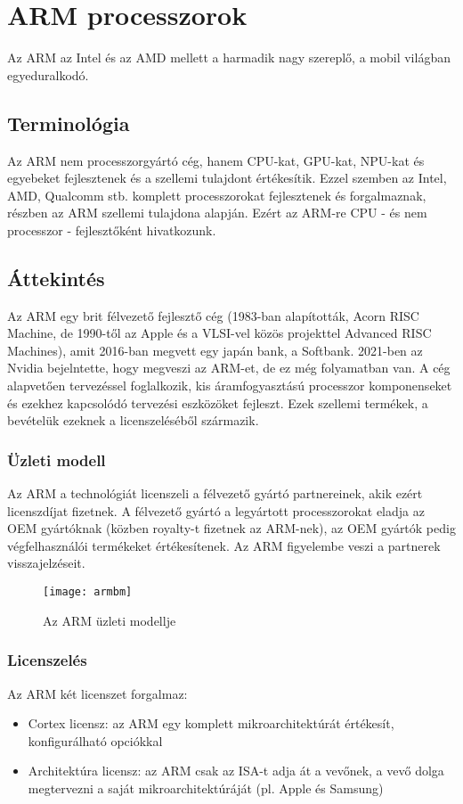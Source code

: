 
\chapter{ARM processzorok}

Az ARM az Intel és az AMD mellett a harmadik nagy szereplő, a mobil világban egyeduralkodó.

\section{Terminológia}
Az ARM nem processzorgyártó cég, hanem CPU-kat, GPU-kat, NPU-kat és egyebeket fejlesztenek és a szellemi tulajdont értékesítik.
Ezzel szemben az Intel, AMD, Qualcomm stb. komplett processzorokat fejlesztenek és forgalmaznak, részben az ARM szellemi tulajdona alapján.
Ezért az ARM-re CPU - és nem processzor - fejlesztőként hivatkozunk.

\section{Áttekintés}
Az ARM egy brit félvezető fejlesztő cég (1983-ban alapították, Acorn RISC Machine, de 1990-től az Apple és a VLSI-vel közös projekttel Advanced RISC Machines), amit 2016-ban megvett egy japán bank, a Softbank.
2021-ben az Nvidia bejelntette, hogy megveszi az ARM-et, de ez még folyamatban van.
A cég alapvetően tervezéssel foglalkozik, kis áramfogyasztású processzor komponenseket és ezekhez kapcsolódó tervezési eszközöket fejleszt.
Ezek szellemi termékek, a bevételük ezeknek a licenszeléséből származik.

\subsection{Üzleti modell}
Az ARM a technológiát licenszeli a félvezető gyártó partnereinek, akik ezért licenszdíjat fizetnek.
A félvezető gyártó a legyártott processzorokat eladja az OEM gyártóknak (közben royalty-t fizetnek az ARM-nek), az OEM gyártók pedig végfelhasználói termékeket értékesítenek.
Az ARM figyelembe veszi a partnerek visszajelzéseit.
\begin{figure}[H]
    \texttt{[image: armbm]}
    \centering
    \caption{Az ARM üzleti modellje}
    \label{fig:armbm}
\end{figure}

\subsection{Licenszelés}
Az ARM két licenszet forgalmaz:
\begin{itemize}
    \item Cortex licensz: az ARM egy komplett mikroarchitektúrát értékesít, konfigurálható opciókkal
    \item Architektúra licensz: az ARM csak az ISA-t adja át a vevőnek, a vevő dolga megtervezni a saját mikroarchitektúráját (pl. Apple és Samsung)
\end{itemize}

